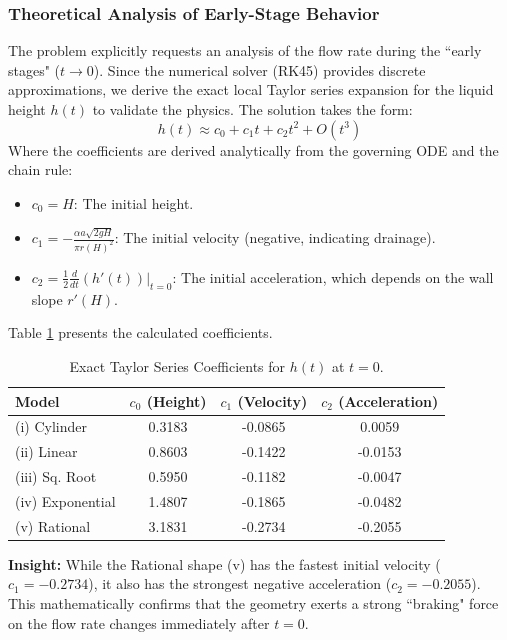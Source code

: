 \documentclass[a4paper, 12pt]{article}
\begin{document}
\subsubsection{Theoretical Analysis of Early-Stage Behavior}
The problem explicitly requests an analysis of the flow rate during the ``early stages" ($t \to 0$). Since the numerical solver (RK45) provides discrete approximations, we derive the exact local Taylor series expansion for the liquid height $h(t)$ to validate the physics. The solution takes the form:
\begin{equation}
    h(t) \approx c_0 + c_1 t + c_2 t^2 + O(t^3)
\end{equation}
Where the coefficients are derived analytically from the governing ODE and the chain rule:
\begin{itemize}
    \item $c_0 = H$: The initial height.
    \item $c_1 = -\frac{\alpha a \sqrt{2gH}}{\pi r(H)^2}$: The initial velocity (negative, indicating drainage).
    \item $c_2 = \frac{1}{2} \frac{d}{dt}(h'(t))|_{t=0}$: The initial acceleration, which depends on the wall slope $r'(H)$.
\end{itemize}

Table \ref{tab:taylor_coeffs} presents the calculated coefficients. 

\begin{table}[H]
    \centering
    \caption{Exact Taylor Series Coefficients for $h(t)$ at $t=0$.}
    \label{tab:taylor_coeffs}
    \begin{tabular}{lccc}
    \toprule
    \textbf{Model} & \textbf{$c_0$ (Height)} & \textbf{$c_1$ (Velocity)} & \textbf{$c_2$ (Acceleration)} \\
    \midrule
    (i) Cylinder & 0.3183 & -0.0865 & 0.0059 \\
    (ii) Linear & 0.8603 & -0.1422 & -0.0153 \\
    (iii) Sq. Root & 0.5950 & -0.1182 & -0.0047 \\
    (iv) Exponential & 1.4807 & -0.1865 & -0.0482 \\
    (v) Rational & 3.1831 & -0.2734 & -0.2055 \\
    \bottomrule
    \end{tabular}
\end{table}

\textbf{Insight:} While the Rational shape (v) has the fastest initial velocity ($c_1 = -0.2734$), it also has the strongest negative acceleration ($c_2 = -0.2055$). This mathematically confirms that the geometry exerts a strong ``braking" force on the flow rate changes immediately after $t=0$.
\end{document}
